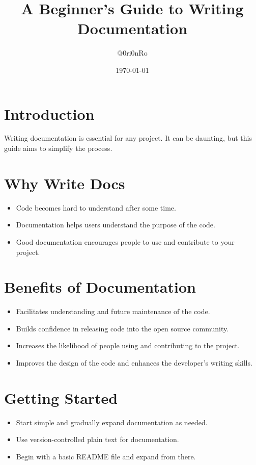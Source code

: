 \documentclass{article}
\title{A Beginner's Guide to Writing Documentation}
\author{@0ri0nRo}
\date{\today}
\begin{document}
\maketitle

\section{Introduction}
Writing documentation is essential for any project. It can be daunting, but this guide aims to simplify the process.

\section{Why Write Docs}
\begin{itemize}
    \item Code becomes hard to understand after some time.
    \item Documentation helps users understand the purpose of the code.
    \item Good documentation encourages people to use and contribute to your project.
\end{itemize}

\section{Benefits of Documentation}
\begin{itemize}
    \item Facilitates understanding and future maintenance of the code.
    \item Builds confidence in releasing code into the open source community.
    \item Increases the likelihood of people using and contributing to the project.
    \item Improves the design of the code and enhances the developer's writing skills.
\end{itemize}

\section{Getting Started}
\begin{itemize}
    \item Start simple and gradually expand documentation as needed.
    \item Use version-controlled plain text for documentation.
    \item Begin with a basic README file and expand from there.
\end{itemize}
\end{document}
